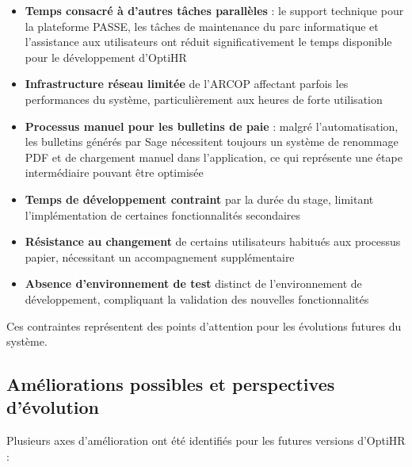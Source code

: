\begin{itemize}
    \item \textbf{Temps consacré à d'autres tâches parallèles} : le support technique pour la plateforme PASSE, les tâches de maintenance du parc informatique et l'assistance aux utilisateurs ont réduit significativement le temps disponible pour le développement d'OptiHR
    
    \item \textbf{Infrastructure réseau limitée} de l'ARCOP affectant parfois les performances du système, particulièrement aux heures de forte utilisation
    
    \item \textbf{Processus manuel pour les bulletins de paie} : malgré l'automatisation, les bulletins générés par Sage nécessitent toujours un système de renommage PDF et de chargement manuel dans l'application, ce qui représente une étape intermédiaire pouvant être optimisée
    
    \item \textbf{Temps de développement contraint} par la durée du stage, limitant l'implémentation de certaines fonctionnalités secondaires
    
    \item \textbf{Résistance au changement} de certains utilisateurs habitués aux processus papier, nécessitant un accompagnement supplémentaire
    
    \item \textbf{Absence d'environnement de test} distinct de l'environnement de développement, compliquant la validation des nouvelles fonctionnalités
\end{itemize}

Ces contraintes représentent des points d'attention pour les évolutions futures du système.

\subsection{Améliorations possibles et perspectives d'évolution}
Plusieurs axes d'amélioration ont été identifiés pour les futures versions d'OptiHR :

